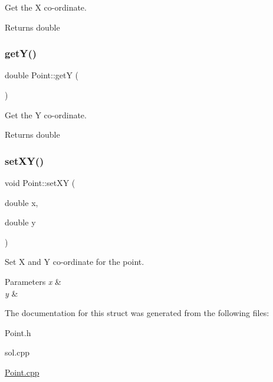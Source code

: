 Get the X co-\/ordinate. 

\begin{DoxyReturn}{Returns}
double 
\end{DoxyReturn}
\mbox{\label{classPoint_aa278c8bcb8aeb4101023a4baf473b547}} 
\subsubsection{\texorpdfstring{get\+Y()}{getY()}}
{\footnotesize\ttfamily double Point\+::getY (\begin{DoxyParamCaption}{ }\end{DoxyParamCaption})}



Get the Y co-\/ordinate. 

\begin{DoxyReturn}{Returns}
double 
\end{DoxyReturn}
\mbox{\label{classPoint_ad62d5a34b47be46beab076e61628e470}} 
\subsubsection{\texorpdfstring{set\+X\+Y()}{setXY()}}
{\footnotesize\ttfamily void Point\+::set\+XY (\begin{DoxyParamCaption}\item[{double}]{x,  }\item[{double}]{y }\end{DoxyParamCaption})}



Set X and Y co-\/ordinate for the point. 


\begin{DoxyParams}{Parameters}
{\em x} & \\
\hline
{\em y} & \\
\hline
\end{DoxyParams}


The documentation for this struct was generated from the following files\+:\begin{DoxyCompactItemize}
\item 
Point.\+h\item 
sol.\+cpp\item 
\hyperlink{Point_8cpp}{Point.\+cpp}\end{DoxyCompactItemize}
